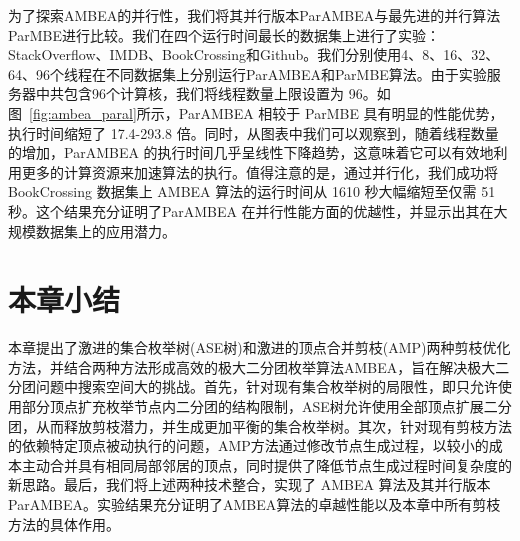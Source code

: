 为了探索AMBEA的并行性，我们将其并行版本ParAMBEA与最先进的并行算法ParMBE进行比较。我们在四个运行时间最长的数据集上进行了实验：StackOverflow、IMDB、BookCrossing和Github。我们分别使用4、8、16、32、64、96个线程在不同数据集上分别运行ParAMBEA和ParMBE算法。由于实验服务器中共包含96个计算核，我们将线程数量上限设置为 96。如图~\ref{fig:ambea_paral}所示，ParAMBEA 相较于 ParMBE 具有明显的性能优势，执行时间缩短了 17.4-293.8 倍。同时，从图表中我们可以观察到，随着线程数量的增加，ParAMBEA 的执行时间几乎呈线性下降趋势，这意味着它可以有效地利用更多的计算资源来加速算法的执行。值得注意的是，通过并行化，我们成功将 BookCrossing 数据集上 AMBEA 算法的运行时间从 1610 秒大幅缩短至仅需 51 秒。这个结果充分证明了ParAMBEA 在并行性能方面的优越性，并显示出其在大规模数据集上的应用潜力。

\section{本章小结}

本章提出了激进的集合枚举树(ASE树)和激进的顶点合并剪枝(AMP)两种剪枝优化方法，并结合两种方法形成高效的极大二分团枚举算法AMBEA，旨在解决极大二分团问题中搜索空间大的挑战。首先，针对现有集合枚举树的局限性，即只允许使用部分顶点扩充枚举节点内二分团的结构限制，ASE树允许使用全部顶点扩展二分团，从而释放剪枝潜力，并生成更加平衡的集合枚举树。其次，针对现有剪枝方法的依赖特定顶点被动执行的问题，AMP方法通过修改节点生成过程，以较小的成本主动合并具有相同局部邻居的顶点，同时提供了降低节点生成过程时间复杂度的新思路。最后，我们将上述两种技术整合，实现了 AMBEA 算法及其并行版本 ParAMBEA。实验结果充分证明了AMBEA算法的卓越性能以及本章中所有剪枝方法的具体作用。
